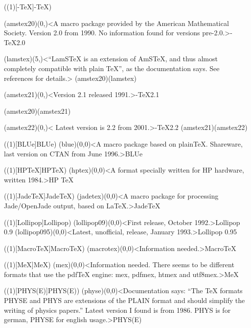 \clearpage
\tograph(\tostruct(1)[\texorpdfstring{\AMS}{AMS}-\TeX]{\AMS-\TeX}){
	\tonode(amstex20)(0,\layer)<A macro package provided by the American Mathematical Society. Version 2.0 from 1990. No information found for versions pre-2.0.>{\AMS-\TeX  2.0}
	\steplayer[-1]

	\tonode(lamstex)(5,\layer)<“LamSTeX{} is an extension of AmSTeX, and thus almost completely compatible with plain TeX”, as the documentation says. See references for details.>{}
	\todraw(amstex20)(lamstex)
	\steplayer[-1]

	\tonode(amstex21)(0,\layer)<Version 2.1 released 1991.>{\AMS-\TeX  2.1}

	\todraw(amstex20)(amstex21)
	\steplayer[-2]

	\tonode(amstex22)(0,\layer)< Latest version is 2.2 from 2001.>{\AMS-\TeX 2.2}
	\todraw(amstex21)(amstex22)
}

\tograph(\tostruct(1)[BLUe]{BLUe}){
	\tonode(blue)(0,0)<A macro package based on plainTeX. Shareware, last version on CTAN from June 1996.>{BLUe}
}

\tograph(\tostruct(1)[HP\TeX]{HP\TeX}){
	\tonode(hptex)(0,0)<A format specially written for HP hardware, written 1984.>{HP \TeX}
}

\tograph(\tostruct(1)[Jade\TeX]{Jade\TeX}){
	\tonode(jadetex)(0,0)<A macro package for processing Jade/OpenJade output, based on LaTeX.>{Jade\TeX}
}

\tograph(\tostruct(1)[Lollipop]{Lollipop}){
	\tonode(lollipop09)(0,0)<First release, October 1992.>{Lollipop 0.9}
	\steplayer
	\tonode(lollipop095)(0,0)<Latest, unofficial, release, January 1993.>{Lollipop 0.95}
}

\tograph(\tostruct(1)[Macro\TeX]{Macro\TeX}){
	\tonode(macrotex)(0,0)<Information needed.>{Macro\TeX}
}

\tograph(\tostruct(1)[MeX]{MeX}){
	\tonode(mex)(0,0)<Information needed. There seems to be different formats that use the pdfTeX engine: mex, pdfmex, htmex and utf8mex.>{MeX}
}

\tograph(\tostruct(1)[PHYS(E)]{PHYS(E)}){
	\tonode(physe)(0,0)<Documentation says: “The TeX formats PHYSE and PHYS are extensions of the PLAIN format
and should simplify the writing of physics papers.” Latest version I found is from 1986. PHYS is for german, PHYSE for english usage.>{PHYS(E)}
}

